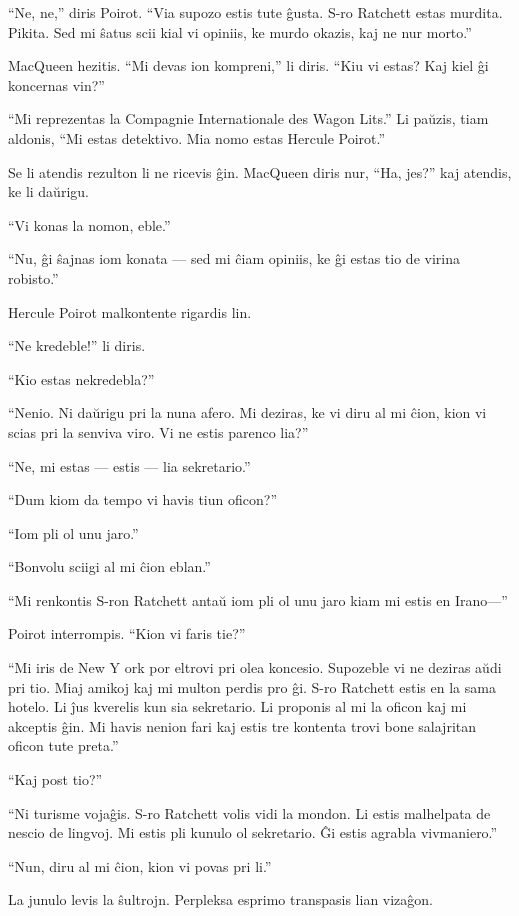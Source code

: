 ``Ne, ne,'' diris Poirot. ``Via supozo estis tute ĝusta. S-ro Ratchett estas murdita. Pikita. Sed mi ŝatus scii kial vi opiniis, ke murdo okazis, kaj ne nur morto.''

MacQueen hezitis. ``Mi devas ion kompreni,'' li diris. ``Kiu vi estas? Kaj kiel ĝi koncernas vin?''

``Mi reprezentas la Compagnie Internationale des Wagon Lits.'' Li paŭzis, tiam aldonis, ``Mi estas detektivo. Mia nomo estas Hercule Poirot.''

Se li atendis rezulton li ne ricevis ĝin. MacQueen diris nur, ``Ha, jes?'' kaj atendis, ke li daŭrigu.

``Vi konas la nomon, eble.''

``Nu, ĝi ŝajnas iom konata --- sed mi ĉiam opiniis, ke ĝi estas tio de virina robisto.''

Hercule Poirot malkontente rigardis lin.

``Ne kredeble!'' li diris.

``Kio estas nekredebla?''

``Nenio. Ni daŭrigu pri la nuna afero. Mi deziras, ke vi diru al mi ĉion, kion vi scias pri la senviva viro. Vi ne estis parenco lia?''

``Ne, mi estas --- estis --- lia sekretario.''

``Dum kiom da tempo vi havis tiun oficon?''

``Iom pli ol unu jaro.''

``Bonvolu sciigi al mi ĉion eblan.''

``Mi renkontis S-ron Ratchett antaŭ iom pli ol unu jaro kiam mi estis en Irano---''

Poirot interrompis. ``Kion vi faris tie?''

``Mi iris de New Y ork por eltrovi pri olea koncesio. Supozeble vi ne deziras aŭdi pri tio. Miaj amikoj kaj mi multon perdis pro ĝi. S-ro Ratchett estis en la sama hotelo. Li ĵus kverelis kun sia sekretario. Li proponis al mi la oficon kaj mi akceptis ĝin. Mi havis nenion fari kaj estis tre kontenta trovi bone salajritan oficon tute preta.''

``Kaj post tio?''

``Ni turisme vojaĝis. S-ro Ratchett volis vidi la mondon. Li estis malhelpata de nescio de lingvoj. Mi estis pli kunulo ol sekretario. Ĝi estis agrabla vivmaniero.''

``Nun, diru al mi ĉion, kion vi povas pri li.''

La junulo levis la ŝultrojn. Perpleksa esprimo transpasis lian vizaĝon.

